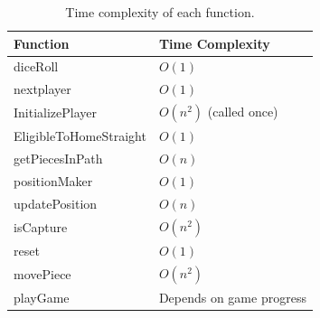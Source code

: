 \documentclass[11pt,a4paper]{article}
\begin{document}
\begin{table}[h]
\centering
\begin{tabular}{>{\ttfamily}l l}
\toprule
\textrm{\textbf{Function}} & \textbf{Time Complexity} \\
\midrule
diceRoll               & $O(1)$ \\
nextplayer             & $O(1)$ \\
InitializePlayer       & $O(n^2)$ (called once) \\
EligibleToHomeStraight & $O(1)$ \\
getPiecesInPath        & $O(n)$ \\
positionMaker          & $O(1)$ \\
updatePosition         & $O(n)$ \\
isCapture              & $O(n^2)$ \\
reset                  & $O(1)$ \\
movePiece              & $O(n^2)$ \\
playGame               & Depends on game progress \\
\bottomrule
\end{tabular}
\caption{Time complexity of each function.}
\end{table}
\end{document}
